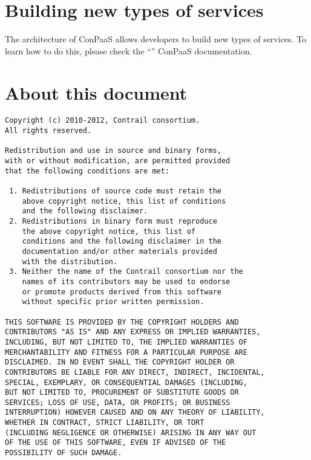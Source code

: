 \documentclass[10pt]{article}
\begin{document}
\section{Building new types of services}

The architecture of ConPaaS allows developers to build new types of
services. To learn how to do this, please check the
``'' ConPaaS documentation.

\section{About this document}

\begin{verbatim}
Copyright (c) 2010-2012, Contrail consortium.
All rights reserved.

Redistribution and use in source and binary forms, 
with or without modification, are permitted provided
that the following conditions are met:

 1. Redistributions of source code must retain the
    above copyright notice, this list of conditions
    and the following disclaimer.
 2. Redistributions in binary form must reproduce
    the above copyright notice, this list of 
    conditions and the following disclaimer in the
    documentation and/or other materials provided
    with the distribution.
 3. Neither the name of the Contrail consortium nor the
    names of its contributors may be used to endorse
    or promote products derived from this software 
    without specific prior written permission.

THIS SOFTWARE IS PROVIDED BY THE COPYRIGHT HOLDERS AND
CONTRIBUTORS "AS IS" AND ANY EXPRESS OR IMPLIED WARRANTIES,
INCLUDING, BUT NOT LIMITED TO, THE IMPLIED WARRANTIES OF
MERCHANTABILITY AND FITNESS FOR A PARTICULAR PURPOSE ARE
DISCLAIMED. IN NO EVENT SHALL THE COPYRIGHT HOLDER OR
CONTRIBUTORS BE LIABLE FOR ANY DIRECT, INDIRECT, INCIDENTAL,
SPECIAL, EXEMPLARY, OR CONSEQUENTIAL DAMAGES (INCLUDING, 
BUT NOT LIMITED TO, PROCUREMENT OF SUBSTITUTE GOODS OR 
SERVICES; LOSS OF USE, DATA, OR PROFITS; OR BUSINESS 
INTERRUPTION) HOWEVER CAUSED AND ON ANY THEORY OF LIABILITY,
WHETHER IN CONTRACT, STRICT LIABILITY, OR TORT
(INCLUDING NEGLIGENCE OR OTHERWISE) ARISING IN ANY WAY OUT
OF THE USE OF THIS SOFTWARE, EVEN IF ADVISED OF THE
POSSIBILITY OF SUCH DAMAGE.
\end{verbatim}
\end{document}
